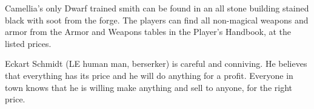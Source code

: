 Camellia's only Dwarf trained smith can be found in an all stone building stained black with soot from the forge.
The players can find all non-magical weapons and armor from the Armor and Weapons tables in the Player's Handbook, at the listed prices.

Eckart Schmidt (LE human man, berserker) is careful and conniving.
He believes that everything has its price and he will do anything for a profit.
Everyone in town knows that he is willing make anything and sell to anyone, for the right price.
